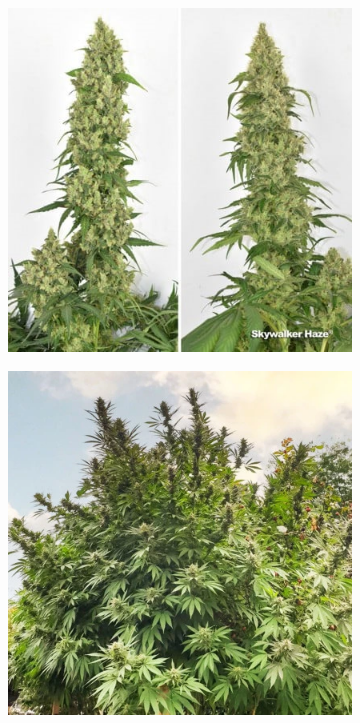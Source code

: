 \begin{figure}[H]
\begin{minipage}[t]{0.48\textwidth}
\begin{subfigure}[t]{.48\textwidth}
            \includegraphics[width=\linewidth]{../figures/DUTCH-PASSION_Skywalker-Haze_2}
            \label{fig:cannabis_skywalker-haze_2}
        \end{subfigure}
        \caption[DUTCH PASSION Skywalker Haze]{DUTCH PASSION Skywalker Haze cultivar. From: }
        \label{fig:cannabis_skywalker-haze}
    \end{minipage}
    \hfill
    \begin{minipage}[t]{0.48\textwidth}
        \begin{subfigure}[t]{.48\textwidth}
            \includegraphics[width=\linewidth]{../figures/DUTCH-PASSION_Frisian-Dew_1}

\end{subfigure}
\end{minipage}
\end{figure}
